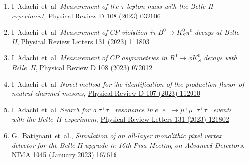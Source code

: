 \documentclass[12pt]{article}
\begin{document}
\begin{justify}
\begin{enumerate}[a.]
\begin{enumerate}[1.]
  \item I~Adachi~et~al. \emph{Measurement of the $\tau$ lepton mass with the Belle II experiment}, \href{https://doi.org/10.1103/PhysRevD.108.032006}{Physical Review D 108 (2023) 032006}
  \item I~Adachi~et~al. \emph{Measurement of $CP$ violation in $B^0 \rightarrow K^0_{S} \pi^0$ decays at Belle II}, \href{https://doi.org/10.1103/PhysRevLett.131.111803}{Physical Review Letters 131 (2023) 111803}
  \item I~Adachi~et~al. \emph{Measurement of $CP$ asymmetries in $B^0 \rightarrow \phi K^0_{S}$ decays with Belle~II}, \href{https://doi.org/10.1103/PhysRevD.108.072012}{Physical Review D 108 (2023) 072012}
  \item I~Adachi~et~al. \emph{Novel method for the identification of the production flavor of neutral charmed mesons}, \href{https://doi.org/10.1103/PhysRevD.107.112010}{Physical Review D 107 (2023) 112010}
  \item I~Adachi~et~al. \emph{Search for a $\tau^+\tau^-$ resonance in $e^{+}e^{-}\rightarrow \mu^{+}\mu^{-} \tau^+\tau^-$ events with the Belle~II experiment}, \href{https://doi.org/10.1103/PhysRevLett.131.121802}{Physical Review Letters 131 (2023) 121802}
  \item G.~Batignani~et~al., \emph{Simulation of an all-layer monolithic pixel vertex detector for the Belle II upgrade in 16th Pisa Meeting on Advanced Detectors}, \href{https://doi.org/10.1016/j.nima.2022.167616}{NIMA 1045 (January 2023) 167616}

\end{enumerate}
\end{enumerate}
\end{justify}
\end{document}
